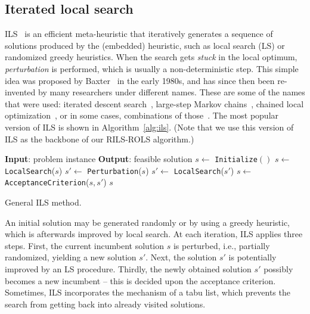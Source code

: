 \documentclass{bmcart}
\begin{document}
\subsection{Iterated local search}
ILS~\cite{lourencco2003iterated} is an efficient meta-heuristic that iteratively generates a sequence of solutions produced by the (embedded) heuristic, such as local search (LS) or randomized greedy heuristics. When the search gets \emph{stuck} in the local optimum, \emph{perturbation} is performed, which is usually a non-deterministic step. This simple idea was proposed by Baxter~\cite{baxter1981local} in the early 1980s, and has since then been re-invented by many researchers under different names. These are some of the names that were used: iterated descent search~\cite{baum1998iterated}, large-step
Markov chains~\cite{martin1991large}, chained local optimization~\cite{martin1996combining}, or in some cases, combinations of those~\cite{applegate2003chained}. The most popular version of ILS is shown in Algorithm~\ref{alg:ils}. (Note that we use this version of ILS as the backbone of our \textsc{RILS}-\textsc{ROLS} algorithm.)

\begin{algorithm}
	\begin{algorithmic}[1] 
		\State \textbf{Input}: problem instance
		\State \textbf{Output}: feasible solution 
		\State $s \gets$ \texttt{Initialize}$()$
		\State  $s \gets$ \texttt{LocalSearch}($s$)
		\State  $s' \gets$ \texttt{Perturbation}($s$)
		\State  $s' \gets$ \texttt{LocalSearch}($s'$)
		\State  $ s \gets$ \texttt{AcceptanceCriterion}($s, s'$)
		\EndWhile
		\State \Return $s$
	\end{algorithmic}
	\caption{General ILS method.}
	\label{alg:ils}
\end{algorithm}  

An initial solution may be generated randomly or by using a greedy heuristic, which is afterwards improved by local search. At each iteration, ILS applies three steps. First, the current incumbent solution $s$ is perturbed, i.e., partially randomized, yielding a new solution $s'$. Next, the solution $s'$ is potentially improved by an LS procedure. Thirdly, the newly obtained solution $s'$  possibly becomes a new incumbent -- this is decided upon the acceptance criterion. Sometimes, ILS incorporates the mechanism of a tabu list, which prevents the search from getting back into already visited solutions.  		 
\end{document}
